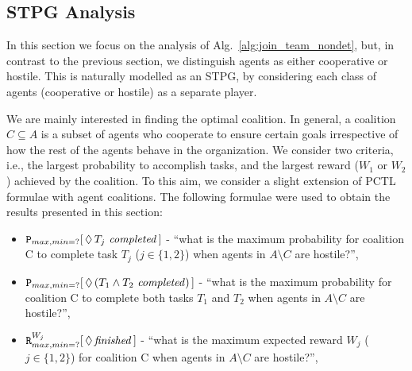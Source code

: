 \documentclass{llncs}
\begin{document}
\vspace{-10pt}
\subsection{STPG Analysis}
\label{subsec:STPG}
\vspace{-5pt}
In this section we focus on the analysis of Alg.~\ref{alg:join_team_nondet}, but, in contrast to the previous section,
we distinguish agents as either cooperative or hostile. This is naturally modelled as an STPG,
by considering each class of agents (cooperative or hostile) as a separate player.

We are mainly interested in finding the optimal coalition. In general,
a coalition $C\subseteq A$ is a subset of agents who cooperate to ensure certain goals irrespective of how the rest of the agents behave in the organization. We consider two criteria, i.e., the largest probability to accomplish tasks, and the largest reward ($W_1$ or $W_2$) achieved by the coalition. To this aim, we consider a slight extension of PCTL formulae with agent coalitions. The following formulae were used to obtain the results presented in this section:
\vspace{-5pt}
\begin{itemize}
 \item ${\tt P}_{max,min=?}[\,\Diamond\,T_{j} \mathit{\ completed}\,]$ -
``what is the maximum probability for coalition C to complete task $T_j$ ($j\in\{1,2\}$) when agents in $A\setminus C$ are hostile?'',
 \item ${\tt P}_{max,min=?}[\,\Diamond\,(T_{1} \wedge T_2 \mathit{\ completed})\,]$ -
``what is the maximum probability for coalition C to complete both tasks $T_1$ and $T_2$ when agents in $A\setminus C$ are hostile?'',
 \item ${\tt R}_{max,min=?}^{W_{j}}[\,\Diamond\,\mathit{finished}\,]$ -
``what is the maximum expected reward $W_j$ ($j\in\{1,2\}$) for coalition C when agents in $A\setminus C$ are hostile?'',
\end{itemize}
\vspace{-35pt}
\end{document}
